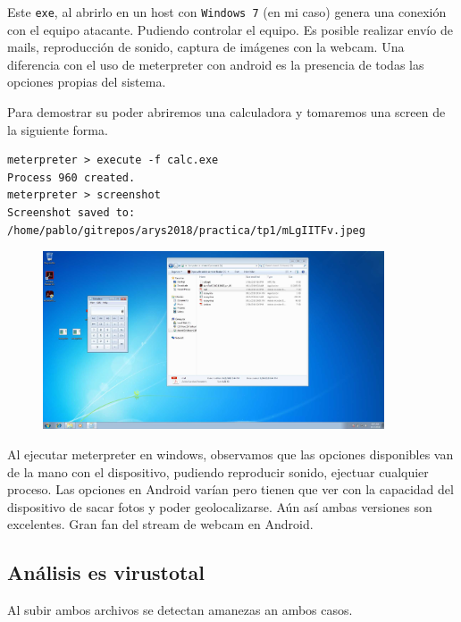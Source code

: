 Este \texttt{exe}, al abrirlo en un host con \texttt{Windows 7} (en mi caso) genera una conexión con el equipo atacante. Pudiendo controlar el equipo. Es posible realizar envío de mails, reproducción de sonido, captura de imágenes con la webcam. Una diferencia con el uso de meterpreter con android es la presencia de todas las opciones propias del sistema.

Para demostrar su poder abriremos una calculadora y tomaremos una screen de la siguiente forma.

\pagebreak

\begin{lstlisting}
meterpreter > execute -f calc.exe
Process 960 created.
meterpreter > screenshot
Screenshot saved to: /home/pablo/gitrepos/arys2018/practica/tp1/mLgIITFv.jpeg
\end{lstlisting}

\begin{figure}[!ht]
   \centering
   \includegraphics[width=0.9\textwidth]{images/screen.jpeg}
   \caption{}
   \centering
\end{figure}

Al ejecutar meterpreter en windows, observamos que las opciones disponibles van de la mano con el dispositivo, pudiendo reproducir sonido, ejectuar cualquier proceso. Las opciones en Android varían pero tienen que ver con la capacidad del dispositivo de sacar fotos y poder geolocalizarse. Aún así ambas versiones son excelentes. Gran fan del stream de webcam en Android.

\subsection*{Análisis es virustotal}

Al subir ambos archivos se detectan amanezas an ambos casos.

